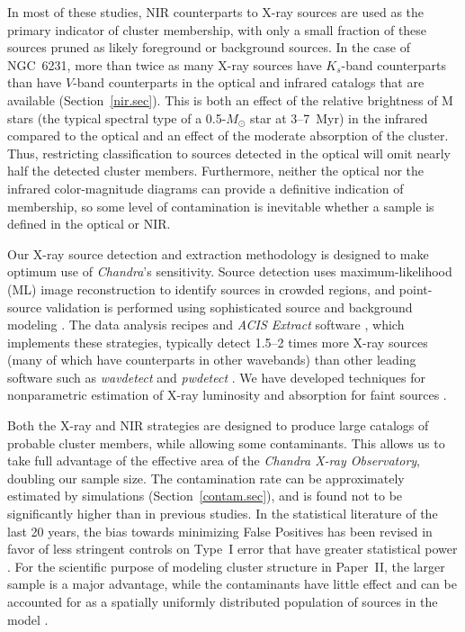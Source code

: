 \documentclass[twocolumn,tighten]{aastex61}
\begin{document}
In most of these studies, NIR counterparts to X-ray sources are used as the primary indicator of cluster membership, with only a small fraction of these sources pruned as likely foreground or background sources. In the case of NGC~6231, more than twice as many X-ray sources have $K_s$-band counterparts than have $V$-band counterparts in the optical and infrared catalogs that are available (Section~\ref{nir.sec}). This is both an effect of the relative brightness of M stars (the typical spectral type of a 0.5-$M_\odot$ star at 3--7~Myr) in the infrared compared to the optical and an effect of the moderate absorption of the cluster. Thus, restricting classification to sources detected in the optical will omit nearly half the detected cluster members. Furthermore, neither the optical nor the infrared color-magnitude diagrams can provide a definitive indication of membership, so some level of contamination is inevitable whether a sample is defined in the optical or NIR.

Our X-ray source detection and extraction methodology is designed to make optimum use of {\it Chandra}'s sensitivity.  Source detection uses maximum-likelihood (ML) image reconstruction to identify sources in crowded regions, and point-source validation is performed using sophisticated source and background modeling \citep{2010ApJ...714.1582B,2014ApJS..213....1T}. The data analysis recipes and {\it ACIS Extract} software \citep{2010ApJ...714.1582B,2012ascl.soft03001B}, which implements these strategies, typically detect 1.5--2 times more X-ray sources (many of which have counterparts in other wavebands) than other leading software such as {\it wavdetect} \citep{2002ApJS..138..185F} and {\it pwdetect} \citep{1997ApJ...483..350D}. We have developed techniques for nonparametric estimation of X-ray luminosity and absorption for faint sources \citep{2010ApJ...708.1760G}.

Both the X-ray and NIR strategies are designed to produce large catalogs of probable cluster members, while allowing some contaminants. This allows us to take full advantage of the effective area of the {\it Chandra X-ray Observatory}, doubling our sample size. The contamination rate can be approximately estimated by simulations (Section~\ref{contam.sec}), and is found not to be significantly higher than in previous studies. In the statistical literature of the last 20 years, the bias towards minimizing False Positives has been revised in favor of less stringent controls on Type~I error that have greater statistical power \citep[cf.\ False Discovery Rate;][]{MR1325392}. For the scientific purpose of modeling cluster structure in Paper~II, the larger sample is a major advantage, while the contaminants have little effect and can be accounted for as a spatially uniformly distributed population of sources in the model \citep[e.g.,][]{2014ApJ...787..107K}.
\end{document}
